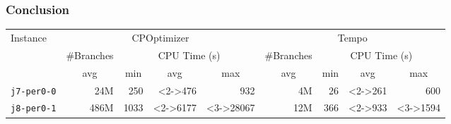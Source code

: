 
\begin{frame}
\frametitle{Conclusion}


\vfill

\begin{center}
\begin{footnotesize}


\begin{tabular}{lrrrrrrrr}
\toprule
\multirow{2}{*}{Instance}&  \multicolumn{4}{c}{CPOptimizer} & \multicolumn{4}{c}{Tempo}\\
\cmidrule(rr){2-5}\cmidrule(rr){6-9}
& \multicolumn{1}{c}{\#Branches} & \multicolumn{3}{c}{CPU Time (s)} & \multicolumn{1}{c}{\#Branches} & \multicolumn{3}{c}{CPU Time (s)} \\\cmidrule(rl){2-2}\cmidrule(rl){3-5}\cmidrule(rl){6-6}\cmidrule(rl){7-9}
 & \multicolumn{1}{c}{avg} & \multicolumn{1}{c}{min} & \multicolumn{1}{c}{avg} & \multicolumn{1}{c}{max} & \multicolumn{1}{c}{avg} & \multicolumn{1}{c}{min} & \multicolumn{1}{c}{avg} & \multicolumn{1}{c}{max} \\
\midrule

\texttt{j7-per0-0} & 24M & 250 & \cellcolor{red!50}<2->476 & 932 & 4M & 26 & \cellcolor{green!50}<2->261 & 600\\
\texttt{j8-per0-1} & 486M & 1033 & \cellcolor{red!50}<2->6177 & \cellcolor{red!50}<3->28067 & 12M & 366 & \cellcolor{green!50}<2->933 & \cellcolor{green!50}<3->1594\\
\bottomrule
\end{tabular}




\end{footnotesize}
\end{center}
\end{frame}
